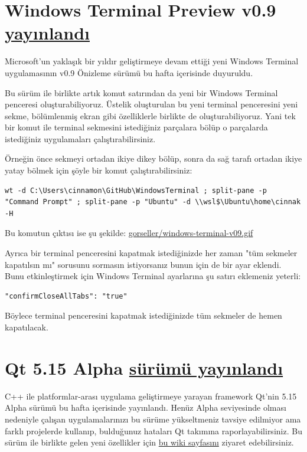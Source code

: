 \documentclass[11pt]{article}
\begin{document}
\section{Windows Terminal Preview v0.9 \href{https://devblogs.microsoft.com/commandline/windows-terminal-preview-v0-9-release/}{yayınlandı}}
\label{sec:orgf258fc4}
Microsoft'un yaklaşık bir yıldır geliştirmeye devam ettiği yeni Windows
Terminal uygulamasının v0.9 Önizleme sürümü bu hafta içerisinde duyuruldu.

Bu sürüm ile birlikte artık komut satırından da yeni bir Windows Terminal
penceresi oluşturabiliyoruz. Üstelik oluşturulan bu yeni terminal penceresini
yeni sekme, bölümlenmiş ekran gibi özelliklerle birlikte de oluşturabiliyoruz.
Yani tek bir komut ile terminal sekmesini istediğiniz parçalara bölüp o
parçalarda istediğiniz uygulamaları çalıştırabilirsiniz.

Örneğin önce sekmeyi ortadan ikiye dikey bölüp, sonra da sağ tarafı ortadan
ikiye yatay bölmek için şöyle bir komut çalıştırabilirsiniz:
\begin{verbatim}
wt -d C:\Users\cinnamon\GitHub\WindowsTerminal ; split-pane -p "Command Prompt" ; split-pane -p "Ubuntu" -d \\wsl$\Ubuntu\home\cinnak -H
\end{verbatim}

Bu komutun çıktısı ise şu şekilde:
\url{gorseller/windows-terminal-v09.gif}

Ayrıca bir terminal penceresini kapatmak istediğinizde her zaman "tüm sekmeler
kapatılsın mı" sorusunu sormasın istiyorsanız bunun için de bir ayar eklendi.
Bunu etkinleştirmek için Windows Terminal ayarlarına şu satırı eklemeniz
yeterli:
\begin{verbatim}
"confirmCloseAllTabs": "true"
\end{verbatim}
Böylece terminal penceresini kapatmak istediğinizde tüm sekmeler de hemen
kapatılacak.
\section{Qt 5.15 Alpha \href{https://www.qt.io/blog/qt-5.15-alpha-released}{sürümü yayınlandı}}
\label{sec:orgc0577e1}
C++ ile platformlar-arası uygulama geliştirmeye yarayan framework Qt'nin 5.15
Alpha sürümü bu hafta içerisinde yayınlandı. Henüz Alpha seviyesinde olması
nedeniyle çalışan uygulamalarınızı bu sürüme yükseltmeniz tavsiye edilmiyor
ama farklı projelerde kullanıp, bulduğunuz hataları Qt takımına
raporlayabilirsiniz. Bu sürüm ile birlikte gelen yeni özellikler için \href{https://wiki.qt.io/New\_Features\_in\_Qt\_5.15}{bu wiki
sayfasını} ziyaret edebilirsiniz.
\end{document}

